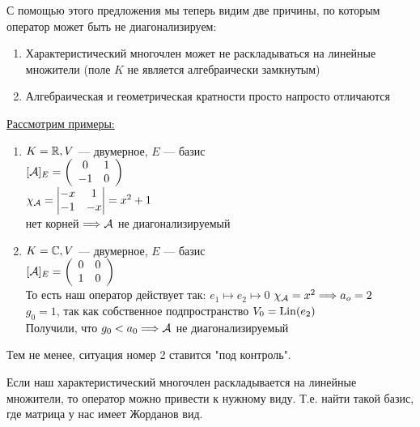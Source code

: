 \vspace*{5mm}

С помощью этого предложения мы теперь видим две причины, по которым оператор может быть не диагонализируем:
\begin{enumerate}
    \item Характеристический многочлен может не раскладываться на линейные множители (поле $K$ не является алгебраически замкнутым)
    \item Алгебраическая и геометрическая кратности просто напросто отличаются
\end{enumerate}

\underline{Рассмотрим примеры:}
\begin{enumerate}
    \item $ K = \mathbb{R}, V$ --- двумерное, $E$ --- базис \\
    $ [\mathcal{A}]_{E} = \left(\begin{array}{cc}
    0 & 1 \\ 
    -1 & 0
    \end{array}\right)$ \\
    $ \chi_{\A} =
    \begin{vmatrix*}
        -x & 1 \\
        -1 & -x
    \end{vmatrix*} = x^2 + 1$ \\
    нет корней $ \Longrightarrow \mathcal{A}$ не диагонализируемый

    \item $ K = \mathbb{C}, V$ --- двумерное, $E$ --- базис \\
    $ [\mathcal{A}]_{E} = \left(\begin{array}{cc}
        0 & 0 \\ 
        1 & 0
    \end{array}\right)$ \\
    То есть наш оператор действует так: $e_1 \mapsto e_2 \mapsto 0$
    $\chi_{\mathcal{A}} = x^2 \Longrightarrow a_o = 2$ \\
    $g_0 = 1$, так как собственное подпространство $V_0 = \operatorname{Lin} (e_2)$ \\
    Получили, что $g_0 < a_0 \Longrightarrow \mathcal{A}$ не диагонализируемый
\end{enumerate}

\vspace*{5mm}

Тем не менее, ситуация номер 2 ставится "под контроль".

Если наш характеристический многочлен раскладывается на линейные множители, то оператор можно привести к нужному виду. Т.е. найти такой базис, где матрица у нас имеет Жорданов вид.

